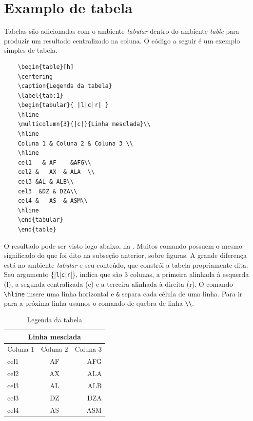 \documentclass{cda}
\begin{document}
\section{Examplo de tabela}
Tabelas são adicionadas com o ambiente \textit{tabular} dentro do ambiente \textit{table} para produzir um resultado centralizado na coluna. O código a seguir é um exemplo simples de tabela.
\begin{verbatim}
	\begin{table}[h]
	\centering
	\caption{Legenda da tabela}
	\label{tab:1}
	\begin{tabular}{ |l|c|r| }
	\hline
	\multicolumn{3}{|c|}{Linha mesclada}\\
	\hline
	Coluna 1 & Coluna 2 & Coluna 3 \\
	\hline
	cel1   & AF    &AFG\\
	cel2 &   AX  & ALA  \\
	cel3 &AL & ALB\\
	cel3  &DZ & DZA\\
	cel4 &   AS  & ASM\\
	\hline
	\end{tabular}
	\end{table}
\end{verbatim}

O resultado pode ser visto logo abaixo, na . Muitos comando possuem o mesmo significado do que foi dito na subseção anterior, sobre figuras. A grande diferença está no ambiente \textit{tabular} e seu conteúdo, que constrói a tabela propriamente dita. Seu argumento \{|\verb|l||\verb|c||\verb|r||\}, indica que são 3 colunas, a primeira alinhada à esquerda (l), a segunda centralizada (c) e a terceira alinhada à direita (r). O comando \verb|\hline| insere uma linha horizontal e \verb|&| separa cada célula de uma linha. Para ir para a próxima linha usamos o comando de quebra de linha \verb|\\|.
\begin{table}[h]
        \renewcommand{\arraystretch}{1.2}
	\centering
	\caption{Legenda da tabela}
	\label{tab:1}
\begin{tabular}{ l|c|r }
	\hline\hline
	\multicolumn{3}{c}{Linha mesclada}\\
	\hline
	Coluna 1 & Coluna 2 & Coluna 3 \\
	\hline
	cel1   & AF    &AFG\\
	cel2 &   AX  & ALA  \\
	cel3 &AL & ALB\\
	cel3  &DZ & DZA\\
	cel4 &   AS  & ASM\\
	\hline\hline
\end{tabular}
\end{table}
\end{document}
